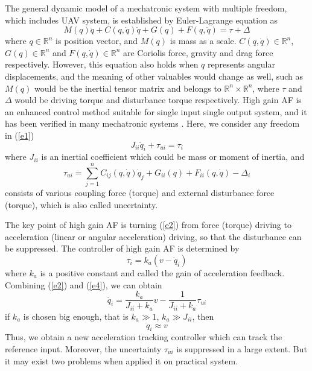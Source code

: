 \documentclass[letterpaper, 10 pt, conference]{ieeeconf}  %
\begin{document}
The general dynamic model of a mechatronic system with multiple freedom, which includes UAV system, is established by Euler-Lagrange equation as
\begin{equation}
    M(q)\ddot{q}+C(q,\dot{q})\dot{q}+G(q)+F(q,\dot{q})=\tau+\Delta \label{e1} 
\end{equation}
where $q\in\mathbb{R}^n$ is position vector, and $M(q)$ is mass as a scale.
$C(q,\dot{q})\in\mathbb{R}^n$, $G(q)\in\mathbb{R}^n$ and $F(q,\dot{q})\in\mathbb{R}^n$ are Coriolis force, gravity and drag force respectively.
However, this equation also holds when $q$ represents angular displacements, and the meaning of other valuables would change as well, such as $M(q)$ would be the inertial tensor matrix and belongs to $\mathbb{R}^n\times\mathbb{R}^n$, where $\tau$ and $\Delta$ would be driving torque and disturbance torque respectively.
High gain AF is an enhanced control method suitable for single input single output system, and it has been verified in many mechatronic systems \cite{Studenny1984,Xu2000,Han2000}. Here, we consider any freedom in (\ref{e1})
\begin{equation}
    J_{ii}\ddot{q}_i+\tau_{ui}=\tau_i \label{e2}
\end{equation}
where $J_{ii}$ is an inertial coefficient which could be mass or moment of inertia, and
\begin{equation}
    \tau_{ui}=\sum_{j=1}^{n}C_{ij}(q,\dot{q})\dot{q}_j+G_{ii}(q)+F_{ii}(q,\dot{q})-\Delta_i \label{e3}
\end{equation}
consists of various coupling force (torque) and external disturbance force (torque), which is also called uncertainty.

The key point of high gain AF is turning (\ref{e2}) from force (torque) driving to acceleration (linear or angular acceleration) driving, so that the disturbance can be suppressed. The controller of high gain AF is determined by
\begin{equation}
    \tau_i=k_a(v-\ddot{q}_i) \label{e4}
\end{equation}
where $k_a$ is a positive constant and called the gain of acceleration feedback.
Combining (\ref{e2}) and (\ref{e4}), we can obtain
\begin{equation}
    \ddot{q}_i=\frac{k_a}{J_{ii}+k_a} v-\frac{1}{J_{ii}+k_a}\tau_{ui} \label{e5}
\end{equation}
if $k_a$ is chosen big enough, that is $k_a\gg 1$, $k_a\gg J_{ii}$, then
\begin{equation}
    \ddot{q}_i\approx v \label{e6}
\end{equation}
Thus, we obtain a new acceleration tracking controller which can track the reference input.
Moreover, the uncertainty $\tau_{ui}$ is suppressed in a large extent.
But it may exist two problems when applied it on practical system.
\end{document}
